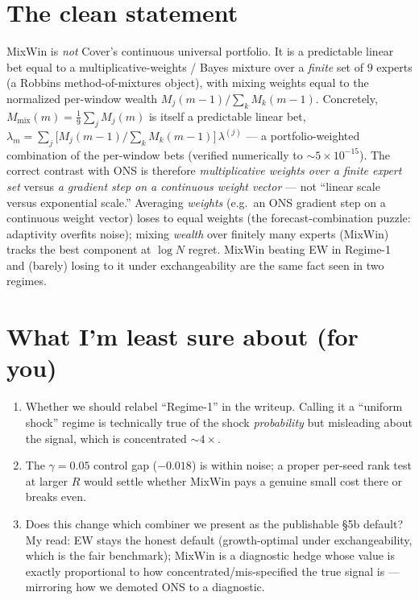 \documentclass[11pt]{article}
\begin{document}
\section{The clean statement}

MixWin is \emph{not} Cover's continuous universal portfolio. It is a predictable
linear bet equal to a multiplicative-weights / Bayes mixture over a \emph{finite}
set of $9$ experts (a Robbins method-of-mixtures object), with mixing weights
equal to the normalized per-window wealth $M_j(m-1)/\sum_k M_k(m-1)$. Concretely,
$M_{\mathrm{mix}}(m) = \tfrac19 \sum_j M_j(m)$ is itself a predictable linear bet,
$\lambda_m = \sum_j \big[M_j(m-1)/\sum_k M_k(m-1)\big]\,\lambda^{(j)}$ --- a
portfolio-weighted combination of the per-window bets (verified numerically to
$\sim 5\times10^{-15}$). The correct contrast with ONS is therefore
\emph{multiplicative weights over a finite expert set} versus \emph{a gradient
step on a continuous weight vector} --- not ``linear scale versus exponential
scale.'' Averaging \emph{weights} (e.g.\ an ONS gradient step on a continuous
weight vector) loses to equal weights (the forecast-combination puzzle:
adaptivity overfits noise); mixing \emph{wealth} over finitely many experts
(MixWin) tracks the best component at $\log N$ regret. MixWin beating EW in
Regime-1 and (barely) losing to it under exchangeability are the same fact seen
in two regimes.

\section{What I'm least sure about (for you)}

\begin{enumerate}
\item[(a)] Whether we should relabel ``Regime-1'' in the writeup. Calling it a
``uniform shock'' regime is technically true of the shock \emph{probability} but
misleading about the signal, which is concentrated $\sim 4\times$.
\item[(b)] The $\gamma=0.05$ control gap ($-0.018$) is within noise; a proper
per-seed rank test at larger $R$ would settle whether MixWin pays a genuine
small cost there or breaks even.
\item[(c)] Does this change which combiner we present as the publishable
\S5b default? My read: EW stays the honest default (growth-optimal under
exchangeability, which is the fair benchmark); MixWin is a diagnostic hedge
whose value is exactly proportional to how concentrated/mis-specified the true
signal is --- mirroring how we demoted ONS to a diagnostic.
\end{enumerate}
\end{document}
